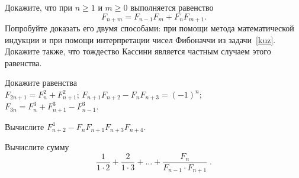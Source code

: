 \begin{problems}
\item
Докажите, что при $n \geq 1$ и $m \geq 0$ выполняется равенство
\[
    F_{n+m} = F_{n-1} F_m + F_n F_{m+1}
.\]
Попробуйте доказать его двумя способами: при помощи метода
математической индукции и при помощи
интерпретации чисел Фибоначчи из задачи~\ref{kuz}.
Докажите также, что тождество Кассини является частным случаем этого равенства.

\item
Докажите равенства
\\
\sbp $F_{2n+1} = F_n^2 + F_{n+1}^2$;
\qquad
\sbp $F_{n+1} F_{n+2} - F_n F_{n+3} = (-1)^{n}$;
\\
\sbp $F_{3n} = F_n^3 + F_{n+1}^3 - F_{n-1}^3$.

\item
Вычислите $F_{n+2}^4 - F_n F_{n + 1} F_{n + 3} F_{n+4}$.

\item
Вычислите сумму
\[
    \frac{1}{1 \cdot 2} +
    \frac{2}{1 \cdot 3}
    + \ldots +
    \frac{F_{n}}{F_{n-1} \cdot F_{n+1}}
\;.\]

\end{problems}

